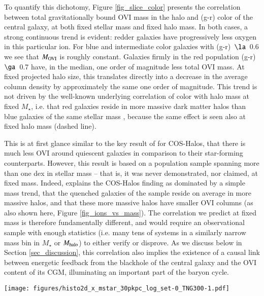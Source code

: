 \documentclass[useAMS,usenatbib]{mnras}
\newcommand{\ovi}{OVI\xspace}
\begin{document}
To quantify this dichotomy, Figure \ref{fig_slice_color} presents the correlation between total gravitationally bound \ovi mass in the halo and (g-r) color of the central galaxy, at both fixed stellar mass and fixed halo mass. In both cases, a strong continuous trend is evident: redder galaxies have progressively less oxygen in this particular ion. For blue and intermediate color galaxies with \mbox{(g-r) $\la$ 0.6} we see that $M_{\rm OVI}$ is roughly constant. Galaxies firmly in the red population \mbox{(g-r) $\ga$ 0.7} have, in the median, one order of magnitude less total \ovi mass. At fixed projected halo size, this translates directly into a decrease in the average column density by approximately the same one order of magnitude. This trend is not driven by the well-known underlying correlation of color with halo mass at fixed $M_\star$, i.e. that red galaxies reside in more massive dark matter halos than blue galaxies of the same stellar mass \citep{mandelbaum16}, because the same effect is seen also at fixed halo mass (dashed line).

This is at first glance similar to the key result of \cite{tumlinson11} for COS-Halos, that there is much less \ovi around quiescent galaxies in comparison to their star-forming counterparts. However, this result is based on a population sample spanning more than one dex in stellar mass -- that is, it was never demonstrated, nor claimed, at fixed mass. Indeed, \cite{oppenheimer16} explains the COS-Halos finding as dominated by a simple mass trend, that the quenched galaxies of the sample reside on average in more massive halos, and that these more massive halos have smaller \ovi columns (as also shown here, Figure \ref{fig_ions_vs_mass}). The correlation we predict at fixed mass is therefore fundamentally different, and would require an observational sample with enough statistics (i.e. many tens of systems in a similarly narrow mass bin in $M_\star$ or $M_{\rm halo}$) to either verify or disprove. As we discuss below in Section \ref{sec_discussion}, this correlation also implies the existence of a causal link between energetic feedback from the blackhole of the central galaxy and the \ovi content of its CGM, illuminating an important part of the baryon cycle.

\begin{figure*}
\centerline{\texttt{[image: figures/histo2d\_x\_mstar\_30pkpc\_log\_set-0\_TNG300-1.pdf]}}
\caption{ Six different relations of various galaxy/halo properties as a function of \textbf{stellar} mass for central galaxies at $z=0$. 
In each case, we include the median relation (black solid line) and the 10-90 percentiles (dotted black lines). The background 
color shows the median \ovi mass for all systems in that bin. Here we show
(i) specific star formation rate, 
(ii) galaxy gas metallicity,
(iii) galactic gas fraction,
(iv) size (half mass radii) of the gas,
(v) mean volume-weighted temperature of halo gas,
and (vi) the total gravitationally bound gas-phase metal mass.
 \label{fig_hist2d_mstar_1}} 
\end{figure*}
\end{document}
